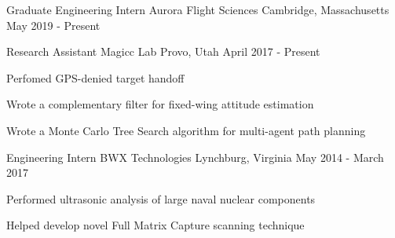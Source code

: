 

\begin{cventries}

  \scventry
    {Graduate Engineering Intern} %
    {Aurora Flight Sciences} %
    {Cambridge, Massachusetts} %
    {May 2019 - Present} %

  \cventry
    {Research Assistant} %
    {Magicc Lab} %
    {Provo, Utah} %
    {April 2017 - Present} %
    {
      \begin{cvitems} %
      \item  {Perfomed GPS-denied target handoff}
      \item  {Wrote a complementary filter for fixed-wing attitude estimation}
      \item  {Wrote a Monte Carlo Tree Search algorithm for multi-agent path planning}
      \end{cvitems}
    }


  \cventry
    {Engineering Intern} %
    {BWX Technologies} %
    {Lynchburg, Virginia} %
    {May 2014 - March 2017} %
    {
      \begin{cvitems} %
      \item  {Performed ultrasonic analysis of large naval nuclear components}
      \item  {Helped develop novel Full Matrix Capture scanning technique}
      \end{cvitems}
    }

\end{cventries}
